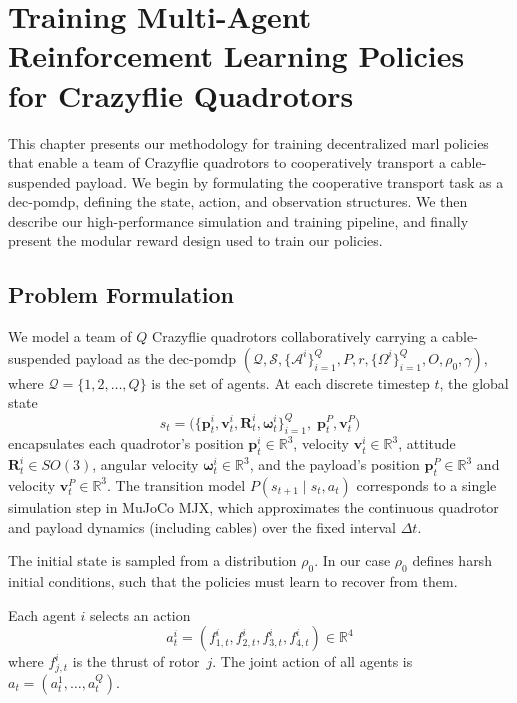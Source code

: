 \chapter{Training Multi-Agent Reinforcement Learning Policies for Crazyflie Quadrotors}

This chapter presents our methodology for training decentralized \gls{marl} policies that enable a team of Crazyflie quadrotors to cooperatively transport a cable-suspended payload. We begin by formulating the cooperative transport task as a \gls{dec-pomdp}, defining the state, action, and observation structures. We then describe our high-performance simulation and training pipeline, and finally present the modular reward design used to train our policies.
\section{Problem Formulation}

We model a team of $Q$ Crazyflie quadrotors collaboratively carrying a cable-suspended payload as the \gls{dec-pomdp} $(\mathcal{Q}, \mathcal{S}, \{\mathcal{A}^i\}_{i=1}^Q, P, r, \{\Omega^i\}_{i=1}^Q, O, \rho_0, \gamma)$, where $\mathcal{Q} = \{1,2,\dots,Q\}$ is the set of agents. At each discrete timestep $t$, the global state 
\begin{equation}
s_t = \bigl(\{\mathbf{p}^i_t,\mathbf{v}^i_t,\mathbf{R}^i_t,\boldsymbol{\omega}^i_t\}_{i=1}^Q,\; \mathbf{p}^P_t,\mathbf{v}^P_t\bigr)
\end{equation}
encapsulates each quadrotor's position $\mathbf{p}^i_t \in \mathbb{R}^3$, velocity $\mathbf{v}^i_t \in \mathbb{R}^3$, attitude $\mathbf{R}^i_t \in SO(3)$, angular velocity $\boldsymbol{\omega}^i_t \in \mathbb{R}^3$, and the payload's position $\mathbf{p}^P_t \in \mathbb{R}^3$ and velocity $\mathbf{v}^P_t \in \mathbb{R}^3$. The transition model $P(s_{t+1}\mid s_t, a_t)$ corresponds to a single simulation step in MuJoCo MJX, which approximates the continuous quadrotor and payload dynamics (including cables) over the fixed interval $\Delta t$.

The initial state is sampled from a distribution $\rho_0$. In our case $\rho_0$ defines harsh initial conditions, such that the policies must learn to recover from them.

Each agent $i$ selects an action 
\begin{equation}
a^i_t = (f^i_{1,t},f^i_{2,t},f^i_{3,t},f^i_{4,t}) \in \mathbb{R}^4
\end{equation}
where $f^i_{j,t}$ is the thrust of rotor~$j$. The joint action of all agents is $a_t = (a^1_t,\dots,a^Q_t)$. 

